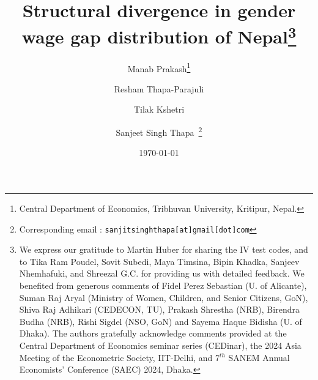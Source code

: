 \begin{titlepage}
\title{\vspace{-2.0cm}Structural divergence in gender wage gap distribution of Nepal\footnote{We express our gratitude to Martin Huber for sharing the IV test codes, and to Tika Ram Poudel, Sovit Subedi, Maya Timsina, Bipin Khadka, Sanjeev Nhemhafuki, and Shreezal G.C. for providing us with detailed feedback. We benefited from generous comments of Fidel Perez Sebastian (U. of Alicante), Suman Raj Aryal (Ministry of Women, Children, and Senior Citizens, GoN), Shiva Raj Adhikari (CEDECON, TU), Prakash Shrestha (NRB), Birendra Budha (NRB), Rishi Sigdel (NSO, GoN) and Sayema Haque Bidisha (U. of Dhaka). The authors gratefully acknowledge comments provided at the Central Department of Economics seminar series (CEDinar), the 2024 Asia Meeting of the Econometric Society, IIT-Delhi, and 7$^{th}$ SANEM Annual Economists’ Conference (SAEC) 2024, Dhaka.}
}
\author{Manab Prakash\thanks{Central Department of Economics, Tribhuvan University, Kritipur, Nepal.} \and   Resham  Thapa-Parajuli\footnotemark[2]
\and Tilak Kshetri\footnotemark[2]  \and Sanjeet Singh Thapa\footnotemark[2]~\thanks{Corresponding email : \texttt{sanjitsinghthapa[at]gmail[dot]com}}}
\date{\today}
\maketitle

\thispagestyle{empty}
\end{titlepage}
\pagebreak 
